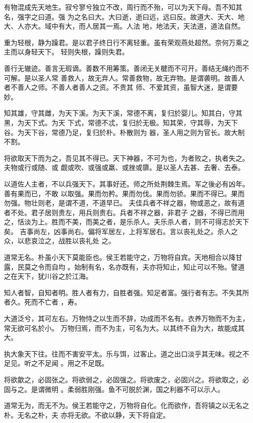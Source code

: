 \documentclass[a4paper, twoside, openany, extrafontsizes]{dlutthesis}
\begin{document}
有物混成先天地生。寂兮寥兮独立不改，周行而不殆，可以为天下母。吾不知其名，强字之曰道。强
为之名曰大。大曰逝，逝曰远，远曰反。故道大、天大、地大、人亦大。域中有大，而人居其一焉。人法
地，地法天，天法道，道法自然。

重为轻根，静为躁君。是以君子终日行不离轻重。虽有荣观燕处超然。奈何万乘之主而以身轻天下。
轻则失根，躁则失君。

善行无辙迹。善言无瑕谪。善数不用筹策。善闭无关楗而不可开。善结无绳约而不可解。是以圣人常
善救人，故无弃人。常善救物，故无弃物。是谓袭明。故善人者不善人之师。不善人者善人之资。不贵其
师、不爱其资，虽智大迷，是谓要妙。

知其雄，守其雌，为天下溪。为天下溪，常德不离，复归於婴儿。知其白，守其黑，为天下式。为天
下式，常德不忒，复归於无极。知其荣，守其辱，为天下谷。为天下谷，常德乃足，复归於朴。朴散则为
器，圣人用之则为官长。故大制不割。

将欲取天下而为之，吾见其不得已。天下神器，不可为也，为者败之，执者失之。夫物或行或随、或
觑或吹、或强或羸、或挫或隳。是以圣人去甚、去奢、去泰。

以道佐人主者，不以兵强天下。其事好还。师之所处荆棘生焉。军之後必有凶年。善有果而已，不敢
以取强。果而勿矜。果而勿伐。果而勿骄。果而不得已。果而勿强。物壮则老，是谓不道，不道早已。
夫佳兵者不祥之器，物或恶之，故有道者不处。君子居则贵左，用兵则贵右。兵者不祥之器，非君子
之器，不得已而用之，恬淡为上。胜而不美，而美之者，是乐杀人。夫乐杀人者，则不可得志於天下矣。
吉事尚左，凶事尚右。偏将军居左，上将军居右。言以丧礼处之。杀人之众，以悲哀泣之，战胜以丧礼处
之。

道常无名。朴虽小天下莫能臣也。侯王若能守之，万物将自宾。天地相合以降甘露，民莫之令而自均
。始制有名，名亦既有，夫亦将知止，知止可以不殆。譬道之在天下，犹川谷之於江海。

知人者智，自知者明。胜人者有力，自胜者强。知足者富。强行者有志。不失其所者久。死而不亡者
，寿。

大道泛兮，其可左右。万物恃之以生而不辞，功成而不名有。衣养万物而不为主，常无欲可名於小。
万物归焉，而不为主，可名为大。以其终不自为大，故能成其大。

执大象天下往。往而不害安平太。乐与饵，过客止。道之出口淡乎其无味。视之不足见。听之不足闻
。用之不足既。

将欲歙之，必固张之。将欲弱之，必固强之。将欲废之，必固兴之。将欲取之，必固与之。是谓微明
。柔弱胜刚强。鱼不可脱於渊，国之利器不可以示人。

道常无为，而无不为。侯王若能守之，万物将自化。化而欲作，吾将镇之以无名之朴。无名之朴，夫
亦将无欲。不欲以静，天下将自定。
\end{document}
